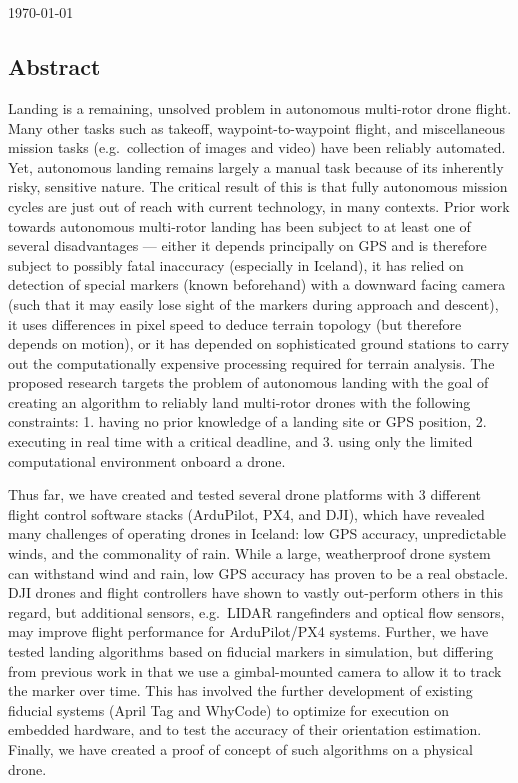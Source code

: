 \begin{center}
    \Large
    \textbf{\documenttitle}
    ~\\[0.5cm]
    \documentauthor
    ~\\[0.5cm]
    \specialdate\today
\end{center}

\subsection*{Abstract}

Landing is a remaining, unsolved problem in autonomous multi-rotor drone flight.
Many other tasks such as takeoff, waypoint-to-waypoint flight,
and miscellaneous mission tasks (e.g.~collection of images and video) have been reliably automated.
Yet, autonomous landing remains largely a manual task because of its inherently risky, sensitive nature.
The critical result of this is that fully autonomous mission cycles are just out of reach with current technology, in many contexts.
Prior work towards autonomous multi-rotor landing has been subject to at least one of several disadvantages ---
either it depends principally on GPS and is therefore subject to possibly fatal inaccuracy (especially in Iceland),
it has relied on detection of special markers (known beforehand) with a downward facing camera (such that it may easily lose sight of the markers during approach and descent),
it uses differences in pixel speed to deduce terrain topology (but therefore depends on motion),
or it has depended on sophisticated ground stations to carry out the computationally expensive processing required for terrain analysis.
The proposed research targets the problem of autonomous landing
with the goal of creating an algorithm to reliably land multi-rotor drones
with the following constraints:
1. having no prior knowledge of a landing site or GPS position,
2. executing in real time with a critical deadline, and
3. using only the limited computational environment onboard a drone.

Thus far, we have created and tested several drone platforms with 3 different flight control software stacks (ArduPilot, PX4, and DJI),
which have revealed many challenges of operating drones in Iceland: low GPS accuracy, unpredictable winds, and the commonality of rain.
While a large, weatherproof drone system can withstand wind and rain, low GPS accuracy has proven to be a real obstacle.
DJI drones and flight controllers have shown to vastly out-perform others in this regard,
but additional sensors, e.g.~LIDAR rangefinders and optical flow sensors, may improve flight performance for ArduPilot/PX4 systems.
Further, we have tested landing algorithms based on fiducial markers in simulation,
but differing from previous work in that we use a gimbal-mounted camera to allow it to track the marker over time.
This has involved the further development of existing fiducial systems (April Tag and WhyCode) to optimize for execution on embedded hardware,
and to test the accuracy of their orientation estimation.
Finally, we have created a proof of concept of such algorithms on a physical drone.

